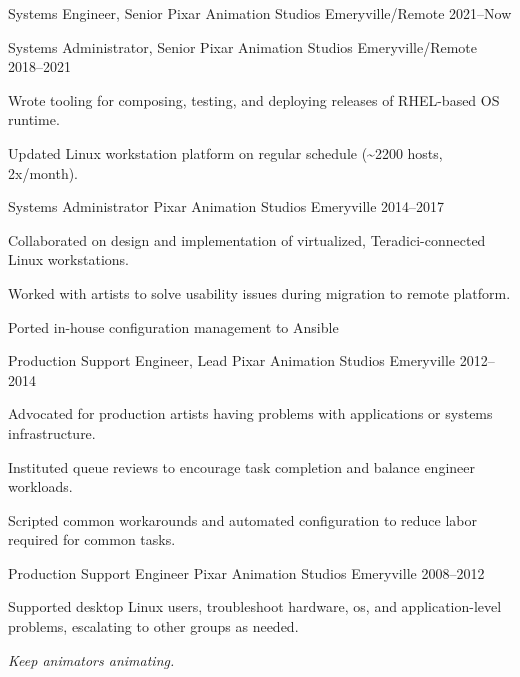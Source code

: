 
\begin{cventries}

  \cventry
  {Systems Engineer, Senior}  %
  {Pixar Animation Studios}  %
  {Emeryville/Remote}  %
  {2021--Now}  %
  {
    \begin{cvitems}  %
    \end{cvitems}
  }

  \cventry
  {Systems Administrator, Senior}  %
  {Pixar Animation Studios}  %
  {Emeryville/Remote}  %
  {2018--2021}  %
  {
    \begin{cvitems}  %
    \item {Wrote tooling for composing, testing, and deploying releases of RHEL-based OS runtime.}
    \item {Updated Linux workstation platform on regular schedule (\textasciitilde{}2200 hosts, 2x/month).}
    \end{cvitems}
  }

  \cventry
  {Systems Administrator}
  {Pixar Animation Studios}
  {Emeryville}
  {2014--2017}
  {
    \begin{cvitems}
    \item {Collaborated on design and implementation of virtualized, Teradici-connected Linux workstations.}
    \item {Worked with artists to solve usability issues during migration to remote platform.}
    \item {Ported in-house configuration management to Ansible}
    \end{cvitems}
  }

  \cventry
  {Production Support Engineer, Lead}
  {Pixar Animation Studios}
  {Emeryville}
  {2012--2014}
  {
    \begin{cvitems}
    \item {Advocated for production artists having problems with applications or systems infrastructure.}
    \item {Instituted queue reviews to encourage task completion and balance engineer workloads.}
    \item {Scripted common workarounds and automated configuration to reduce labor required for common tasks.}
    \end{cvitems}
  }

  \cventry
  {Production Support Engineer}
  {Pixar Animation Studios}
  {Emeryville}
  {2008--2012}
  {
    \begin{cvitems}
    \item {Supported desktop Linux users, troubleshoot hardware, os, and application-level problems, escalating to other groups as needed.}
    \item {\textit{Keep animators animating.}}
    \end{cvitems}
  }

\end{cventries}
